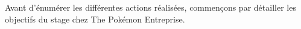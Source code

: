\documentclass[../main.tex]{subfiles}
\begin{document}
    Avant d'énumérer les différentes actions réalisées, commençons par détailler les objectifs du stage chez The Pokémon Entreprise.

    
    
    
    
\end{document}
